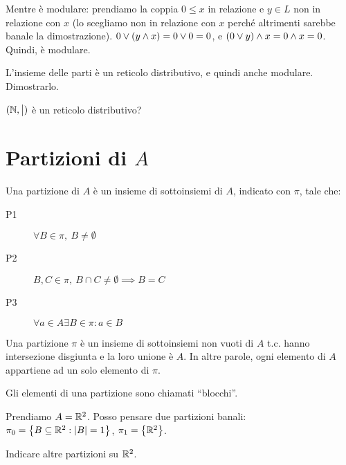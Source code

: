 Mentre \`e modulare: prendiamo la coppia $0 \le x$ in relazione e $y \in L$ non in relazione con $x$ (lo scegliamo non in relazione con $x$ perch\'e altrimenti sarebbe banale la dimostrazione). $ 0 \vee (y \wedge x) = 0 \vee 0 = 0$, e $(0 \vee y) \wedge x = 0 \wedge x = 0$. Quindi, \`e modulare.

\begin{esercizio}
L'insieme delle parti \`e un reticolo distributivo, e quindi anche modulare. Dimostrarlo.
\end{esercizio}

\begin{esercizio}
$(\mathbb{N}, \bigm|)$ \`e un reticolo distributivo?
\end{esercizio}


\section{Partizioni di $A$}

\begin{defn}[Partizione]\label{partizione}
Una partizione di $A$ \`e un insieme di sottoinsiemi di $A$, indicato con $\pi$, tale che:
\begin{description}
  \item[P1\label{itm:P1}] $\forall B \in \pi , \ B \neq \emptyset$
  \item[P2\label{itm:P2}] $B, C \in \pi , \ B \cap C \neq \emptyset \implies B = C$
  \item[P3\label{itm:P3}] $\forall a \in A \exists B \in \pi : a \in B$
\end{description}
\end{defn}
Una partizione $\pi$ \`e un insieme di sottoinsiemi non vuoti di $A$ t.c. hanno intersezione disgiunta e la loro unione \`e $A$. In altre parole, ogni elemento di $A$ appartiene ad un solo elemento di $\pi$.

Gli elementi di una partizione sono chiamati ``blocchi''.

Prendiamo $A = \mathbb{R}^2$. Posso pensare due partizioni banali: $\pi_0 = \left\{ B \subseteq \mathbb{R}^2 : \left\lvert{B}\right\rvert = 1 \right\}$, $\pi_1 = \left\{ \mathbb{R}^2 \right \}$.

\begin{esercizio}
Indicare altre partizioni su $\mathbb{R}^2$.
\end{esercizio}

